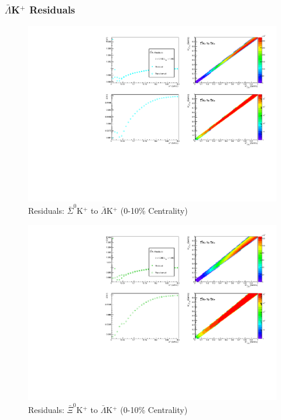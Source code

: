 \documentclass[../AnalysisNoteJBuxton.tex]{subfiles}
\begin{document}
\subsubsection{\texorpdfstring{$\bar{\Lambda}$K$^{+}$}{TEXT} Residuals}
\label{Residuals_ALamKchP}

\begin{figure}[h]
  \centering
  \includegraphics[width=\textwidth]{9_AdditionalFigures/Figures/Residuals/ALamKchP/Residuals_ALamKchP_0010_ASig0KchP_MomResCrctn_NonFlatBgdCrctn_ResidualsIncluded_UsingCoulombOnlyInterpCfs.pdf}
  \caption[Residuals: $\bar{\Sigma}^{0}$K$^{+}$ to $\bar{\Lambda}$K$^{+}$ (0-10\% Centrality)]{Residuals: $\bar{\Sigma}^{0}$K$^{+}$ to $\bar{\Lambda}$K$^{+}$ (0-10\% Centrality)}
  \label{fig:Res_ALamKchP_0010_ASig0KchP}
\end{figure}

\begin{figure}[h]
  \centering
  \includegraphics[width=\textwidth]{9_AdditionalFigures/Figures/Residuals/ALamKchP/Residuals_ALamKchP_0010_AXi0KchP_MomResCrctn_NonFlatBgdCrctn_ResidualsIncluded_UsingCoulombOnlyInterpCfs.pdf}
  \caption[Residuals: $\bar{\Xi}^{0}$K$^{+}$ to $\bar{\Lambda}$K$^{+}$ (0-10\% Centrality)]{Residuals: $\bar{\Xi}^{0}$K$^{+}$ to $\bar{\Lambda}$K$^{+}$ (0-10\% Centrality)}
  \label{fig:Res_ALamKchP_0010_AXi0KchP}
\end{figure}
\end{document}
